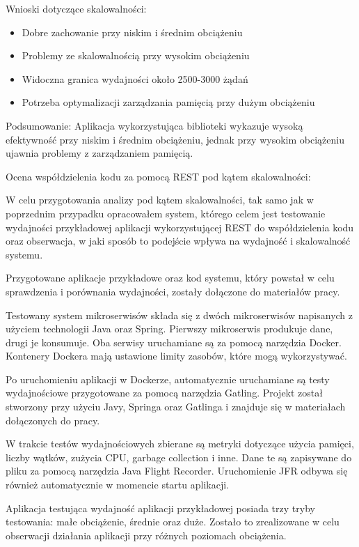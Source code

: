 \documentclass[runningheads,12pt]{llncs}
\begin{document}
Wnioski dotyczące skalowalności: 
\begin{itemize} 
    \item Dobre zachowanie przy niskim i średnim obciążeniu 
    \item Problemy ze skalowalnością przy wysokim obciążeniu 
    \item Widoczna granica wydajności około 2500-3000 żądań 
    \item Potrzeba optymalizacji zarządzania pamięcią przy dużym obciążeniu 
\end{itemize}

Podsumowanie: Aplikacja wykorzystująca biblioteki wykazuje wysoką efektywność przy niskim i średnim obciążeniu, jednak przy wysokim obciążeniu ujawnia problemy z zarządzaniem pamięcią.

\newpage


Ocena współdzielenia kodu za pomocą REST pod kątem skalowalności:

W celu przygotowania analizy pod kątem skalowalności, tak samo jak w poprzednim przypadku opracowałem system, którego celem jest testowanie wydajności przykładowej aplikacji wykorzystującej REST do współdzielenia kodu oraz obserwacja, w jaki sposób to podejście wpływa na wydajność i skalowalność systemu.

Przygotowane aplikacje przykładowe oraz kod systemu, który powstał w celu sprawdzenia i porównania wydajności, zostały dołączone do materiałów pracy.

Testowany system mikroserwisów składa się z dwóch mikroserwisów napisanych z użyciem technologii Java oraz Spring. Pierwszy mikroserwis produkuje dane, drugi je konsumuje. Oba serwisy uruchamiane są za pomocą narzędzia Docker. Kontenery Dockera mają ustawione limity zasobów, które mogą wykorzystywać.

Po uruchomieniu aplikacji w Dockerze, automatycznie uruchamiane są testy wydajnościowe przygotowane za pomocą narzędzia Gatling. Projekt został stworzony przy użyciu Javy, Springa oraz Gatlinga i znajduje się w materiałach dołączonych do pracy.

W trakcie testów wydajnościowych zbierane są metryki dotyczące użycia pamięci, liczby wątków, zużycia CPU, garbage collection i inne. Dane te są zapisywane do pliku za pomocą narzędzia Java Flight Recorder. Uruchomienie JFR odbywa się również automatycznie w momencie startu aplikacji.

Aplikacja testująca wydajność aplikacji przykładowej posiada trzy tryby testowania: małe obciążenie, średnie oraz duże. Zostało to zrealizowane w celu obserwacji działania aplikacji przy różnych poziomach obciążenia.
\end{document}

